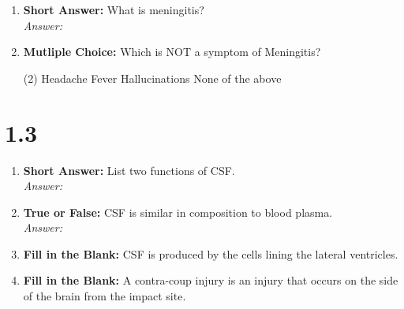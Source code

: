 \begin{enumerate}[label=\textbf{Q1.2.\arabic*}]
      \item \textbf{Short Answer:} What is meningitis? \\
            \textit{Answer:} \\%

      \item \textbf{Mutliple Choice:} Which is NOT a symptom of Meningitis?
            \begin{tasks}[label=(\Alph*), label-width=1.5em, item-indent=1.7em](2) %
                  \task Headache
                  \task Fever
                  \task Hallucinations
                  \task None of the above
            \end{tasks}
\end{enumerate}

\section*{1.3 \squigglyline}
\begin{enumerate}[label=\textbf{Q1.3.\arabic*}]
      \item \textbf{Short Answer:} List two functions of CSF. \\
            \textit{Answer:} \\%

      \item \textbf{True or False:} CSF is similar in composition to blood plasma. \\
            \textit{Answer:} %

      \item \textbf{Fill in the Blank:} CSF is produced by the \underline{\hspace{3cm}} cells lining the lateral ventricles.

      \item \textbf{Fill in the Blank:} A contra-coup injury is an injury that occurs on the \underline{\hspace{3cm}} side of the brain from the impact site.
\end{enumerate}

